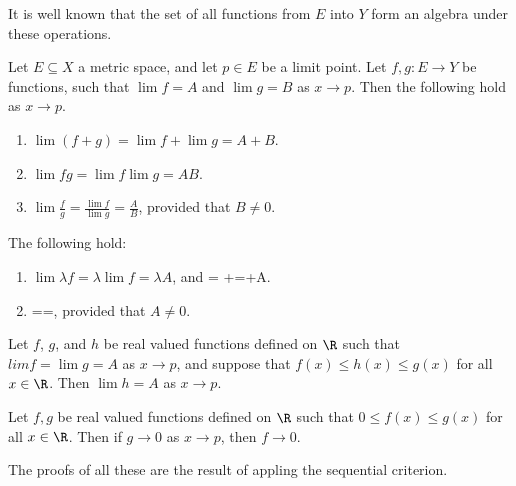 It is well known that the set of all functions from $E$ into  $Y$ form an algebra under 
these operations.

 \begin{theorem}\label{5.1.2}
     Let $E \subseteq X$ a metric space, and let $p \in E$ be a limit point. Let $f,g:E \rightarrow Y$ 
     be functions, such that $\lim{f}=A$ and $\lim{g}=B$ as $x \rightarrow p$. Then the following 
     hold as $x \rightarrow p$.
        \begin{enumerate}[label=(\arabic*)]
            \item $\lim{(f+g)}=\lim{f}+\lim{g}=A+B$.

            \item $\lim{fg}=\lim{f}\lim{g}=AB$.

            \item $\lim{\frac{f}{g}}=\frac{\lim{f}}{\lim{g}}=\frac{A}{B}$, provided that 
                $B \neq 0$.
        \end{enumerate}
\end{theorem}

\begin{corollary}
    The following hold:\
        \begin{enumerate}[label=(\arabic*)]
            \item $\lim{\lambda f}=\lambda{}=\lambda A$, and =
                \lambda+\lim{f}=\lambda+A. 

            \item {}==, provided that $A \neq 0$.

        \end{enumerate}
\end{corollary}

\begin{theorem}\label{5.1.3}
    Let $f$, $g$, and  $h$ be real valued functions defined on $\R$ such that  
    $lim{f}=\lim{g}=A$ as  $x \rightarrow p$, and suppose that  $f(x) \leq h(x) 
    \leq g(x)$ for all  $x \in \R$. Then $\lim{h}=A$ as  $x \rightarrow p$.
\end{theorem}

\begin{corollary}
    Let $f,g$ be real valued functions defined on  $\R$ such that  $0 \leq f(x) \leq g(x)$ 
    for all $x \in \R$. Then if  $g \rightarrow 0$ as  $x \rightarrow p$, then  $f \rightarrow 0$.
\end{corollary}

The proofs of all these are the result of appling the sequential criterion.
